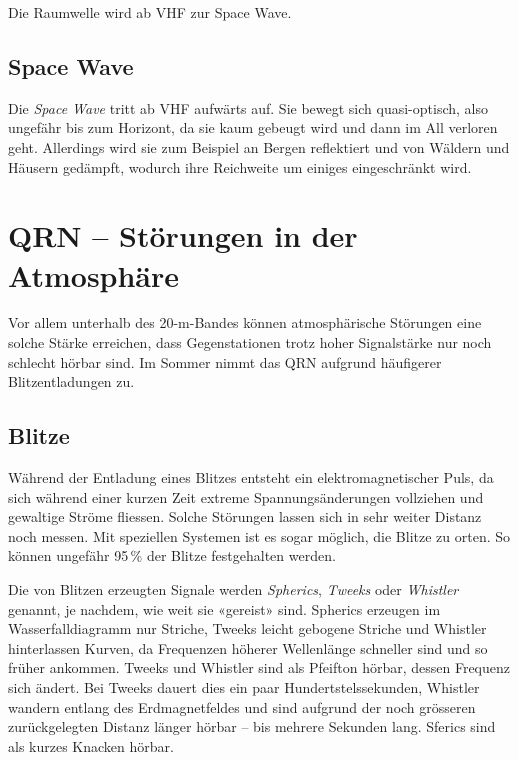 Die Raumwelle wird ab VHF zur Space Wave.

\subsection{Space Wave}
Die \textit{Space Wave} tritt ab VHF aufwärts auf. Sie bewegt sich quasi-optisch, also ungefähr bis zum Horizont, da sie kaum gebeugt wird und dann im All verloren geht. Allerdings wird sie zum Beispiel an Bergen reflektiert und von Wäldern und Häusern gedämpft, wodurch ihre Reichweite um einiges eingeschränkt wird. 

\section{QRN – Störungen in der Atmosphäre}
Vor allem unterhalb des 20-m-Bandes können atmosphärische Störungen eine solche Stärke erreichen, dass Gegenstationen trotz hoher Signalstärke nur noch schlecht hörbar sind. Im Sommer nimmt das QRN aufgrund häufigerer Blitzentladungen zu.

\subsection{Blitze}
Während der Entladung eines Blitzes entsteht ein elektromagnetischer Puls, da sich während einer kurzen Zeit extreme Spannungsänderungen vollziehen und gewaltige Ströme fliessen. Solche Störungen lassen sich in sehr weiter Distanz noch messen. Mit speziellen Systemen ist es sogar möglich, die Blitze zu orten. So können ungefähr 95\,\% der Blitze festgehalten werden.

Die von Blitzen erzeugten Signale werden \textit{Spherics}, \textit{Tweeks} oder \textit{Whistler} genannt, je nachdem, wie weit sie «gereist» sind. Spherics erzeugen im Wasserfalldiagramm nur Striche, Tweeks leicht gebogene Striche und Whistler hinterlassen Kurven, da Frequenzen höherer Wellenlänge schneller sind und so früher ankommen. Tweeks und Whistler sind als Pfeifton hörbar, dessen Frequenz sich ändert. Bei Tweeks dauert dies ein paar Hundertstelssekunden, Whistler wandern entlang des Erdmagnetfeldes und sind aufgrund der noch grösseren zurückgelegten Distanz länger hörbar – bis mehrere Sekunden lang. Sferics sind als kurzes Knacken hörbar.

